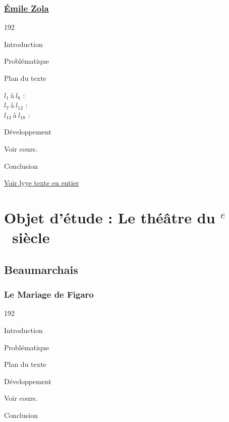 \documentclass[12pt,a4paper]{article}
\begin{document}
				\subsubsection{\href{.extra/Bio/Zola.pdf}{\'Emile Zola}}
\begin{dingautolist}{192}

\item Introduction \par
\item Probl\'ematique \par
	\textcolor{blue}{}
\item Plan du texte \par
	$l_{1}~$\`a$~l_{6}$ :   		\\
    $l_{7}~$\`a$~l_{12}$ :  		\\
    $l_{13}~$\`a$~l_{18}$ : 


\item D\'eveloppement \par
        Voir cours.

\item Conclusion \par


\end{dingautolist}
\href{.extra/Textes/Germinal_Texte_2_12.pdf}{Voir lyye texte en entier}



 \newpage

		\section[La com\'edie du valet]{Objet d'\'etude : Le th\'e\^atre du \textsc{}$^{e}$~siècle}
			\subsection{Beaumarchais}
				\subsubsection{Le Mariage de Figaro}
\begin{dingautolist}{192}

\item Introduction \par
\item Probl\'ematique \par
\item Plan du texte \par
\item D\'eveloppement \par
        Voir cours.

\item Conclusion \par

\end{dingautolist}		
 \newpage
\end{document}
